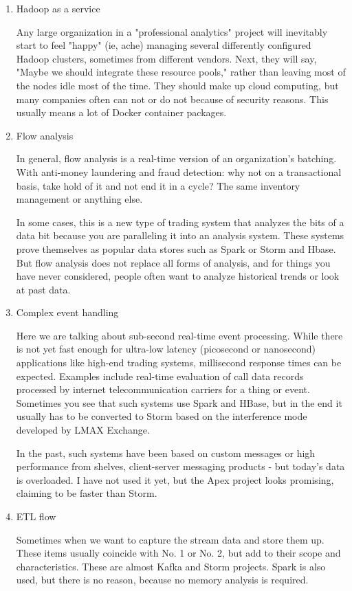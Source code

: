 \documentclass[sigconf]{acmart}
\begin{document}
\begin{enumerate}
  \item Hadoop as a service
  \par  Any large organization in a "professional analytics" project will inevitably start to feel "happy" (ie, ache) managing several differently configured Hadoop clusters, sometimes from different vendors. Next, they will say, "Maybe we should integrate these resource pools," rather than leaving most of the nodes idle most of the time. They should make up cloud computing, but many companies often can not or do not because of security reasons. This usually means a lot of Docker container packages.

  \item   Flow analysis
  \par In general, flow analysis is a real-time version of an organization's batching. With anti-money laundering and fraud detection: why not on a transactional basis, take hold of it and not end it in a cycle? The same inventory management or anything else.
  \par In some cases, this is a new type of trading system that analyzes the bits of a data bit because you are paralleling it into an analysis system. These systems prove themselves as popular data stores such as Spark or Storm and Hbase. But flow analysis does not replace all forms of analysis, and for things you have never considered, people often want to analyze historical trends or look at past data.

  \item Complex event handling
  \par  Here we are talking about sub-second real-time event processing. While there is not yet fast enough for ultra-low latency (picosecond or nanosecond) applications like high-end trading systems, millisecond response times can be expected. Examples include real-time evaluation of call data records processed by internet telecommunication carriers for a thing or event. Sometimes you see that such systems use Spark and HBase, but in the end it usually has to be converted to Storm based on the interference mode developed by LMAX Exchange.
  \par  In the past, such systems have been based on custom messages or high performance from shelves, client-server messaging products - but today's data is overloaded. I have not used it yet, but the Apex project looks promising, claiming to be faster than Storm.

  \item ETL flow
  \par Sometimes when we want to capture the stream data and store them up. These items usually coincide with No. 1 or No. 2, but add to their scope and characteristics. These are almost Kafka and Storm projects. Spark is also used, but there is no reason, because no memory analysis is required.


\end{enumerate}
\end{document}
